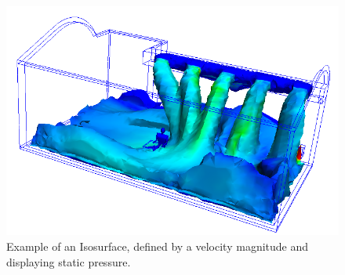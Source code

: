 \begin{figure}
    \centering
    \includegraphics[width=\linewidth]{Ch20Research/figures/isosurface.png}
    \caption{Example of an Isosurface, defined by a velocity magnitude and displaying static pressure.}%
    \label{fig:AutodeskCFDIsosurface}
\end{figure}

